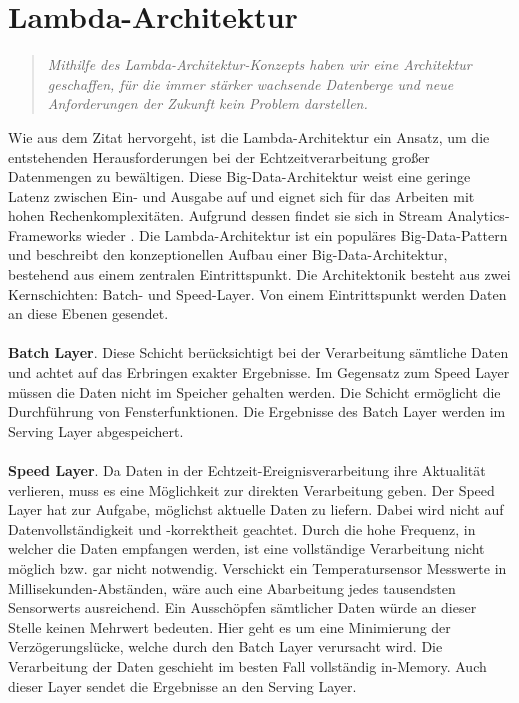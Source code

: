 \section{Lambda-Architektur}

\begin{quote} \textit{\glqq Mithilfe des Lambda-Architektur-Konzepts haben wir eine Architektur geschaffen, für die immer stärker wachsende Datenberge und neue Anforderungen der Zukunft kein Problem darstellen. \grqq~}\cite[S.2]{opitz.2017} \\ \end{quote} 
Wie aus dem Zitat hervorgeht, ist die Lambda-Architektur ein Ansatz, um die entstehenden Herausforderungen bei der Echtzeitverarbeitung großer Datenmengen zu bewältigen. Diese Big-Data-Architektur weist eine geringe Latenz zwischen Ein- und Ausgabe auf und eignet sich für das Arbeiten mit hohen Rechenkomplexitäten. Aufgrund dessen findet sie sich in Stream Analytics-Frameworks wieder \cite{Familiar.2017}. Die Lambda-Architektur ist ein populäres Big-Data-Pattern und beschreibt den konzeptionellen Aufbau einer Big-Data-Architektur, bestehend aus einem zentralen Eintrittspunkt. Die Architektonik besteht aus zwei Kernschichten: Batch- und Speed-Layer. Von einem Eintrittspunkt werden Daten an diese Ebenen gesendet.
\\ \\ \textbf{Batch Layer}. Diese Schicht berücksichtigt bei der Verarbeitung sämtliche Daten und achtet auf das Erbringen exakter Ergebnisse. Im Gegensatz zum Speed Layer müssen die Daten nicht im Speicher gehalten werden. Die Schicht ermöglicht die Durchführung von Fensterfunktionen. Die Ergebnisse des Batch Layer werden im Serving Layer abgespeichert.
\\ \\ \textbf{Speed Layer}. Da Daten in der Echtzeit-Ereignisverarbeitung ihre Aktualität verlieren, muss es eine Möglichkeit zur direkten Verarbeitung geben. Der Speed Layer hat zur Aufgabe, möglichst aktuelle Daten zu liefern. Dabei wird nicht auf Datenvollständigkeit und -korrektheit geachtet. Durch die hohe Frequenz, in welcher die Daten empfangen werden, ist eine vollständige Verarbeitung nicht möglich bzw. gar nicht notwendig. Verschickt ein Temperatursensor Messwerte in Millisekunden-Abständen, wäre auch eine Abarbeitung jedes tausendsten Sensorwerts ausreichend. Ein Ausschöpfen sämtlicher Daten würde an dieser Stelle keinen Mehrwert bedeuten. Hier geht es um eine Minimierung der Verzögerungslücke, welche durch den Batch Layer verursacht wird. Die Verarbeitung der Daten geschieht im besten Fall vollständig in-Memory. Auch dieser Layer sendet die Ergebnisse an den Serving Layer. 
